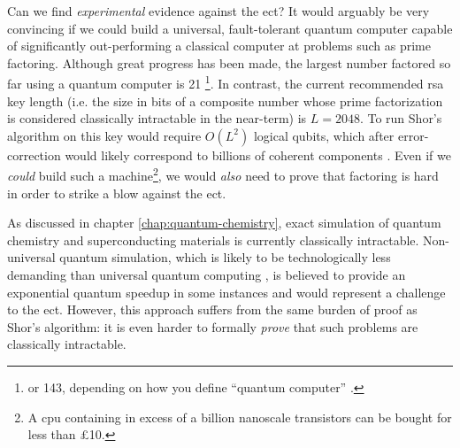 Can we find \emph{experimental} evidence against the \gls{ect}? It would arguably be very convincing if we could build a universal, fault-tolerant quantum computer capable of significantly out-performing a classical computer at problems such as prime factoring. Although great progress has been made, the largest number factored so far using a quantum computer is 21  \cite{Martin-Lopez2012}\footnote{or 143, depending on how you define ``quantum computer'' \cite{Xu2012}.}. In contrast, the current recommended \gls{rsa} key length (i.e. the size in bits of a composite number whose prime factorization is considered classically intractable in the near-term) is $L=2048$. To run Shor's algorithm on this key would require $O(L^2)$ logical qubits, which after error-correction would likely correspond to billions of coherent components \cite{Devitt2012}. Even if we \emph{could} build such a machine\footnote{A \gls{cpu} containing in excess of a billion nanoscale transistors can be bought for less than \pounds 10.}, we would \emph{also} need to prove that factoring is hard in order to strike a blow against the \gls{ect}.  

As discussed in chapter \ref{chap:quantum-chemistry}, exact simulation of quantum chemistry and superconducting materials is currently classically intractable. Non-universal quantum simulation, which is likely to be technologically less demanding than universal quantum computing \cite{Aspuru-Guzik2012}, is believed to provide an exponential quantum speedup in some instances and would represent a challenge to the \gls{ect}. However, this approach suffers from the same burden of proof as Shor's algorithm: it is even harder to formally \emph{prove} that such problems are classically intractable.

